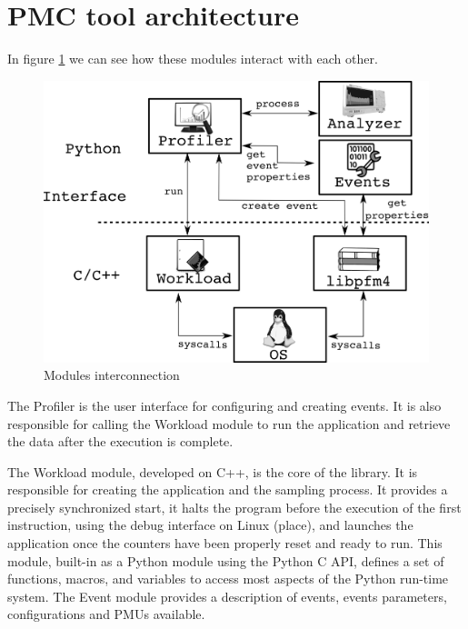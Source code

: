 
\section{PMC tool architecture} \label{sec:PMC_tool_architecture}

In figure \ref{fig:achitecture} we can see how these modules interact with each other.
\begin{figure}[H]
    \centering
    \includegraphics[width=\textwidth]{fingerprint/figures/architecture.png}
    \caption{Modules interconnection}
    \label{fig:achitecture}
\end{figure}

The Profiler is the user interface for configuring and creating events.
It is also responsible for calling the Workload module to run the application and retrieve the data after the execution is complete.

The Workload module, developed on C++, is the core of the library.
It is responsible for creating the application and the sampling process.
It provides a precisely synchronized start, it halts the program before the execution of the first instruction, using the debug interface on Linux (place), and launches the application once the counters have been properly reset and ready to run.
This module, built-in as a Python module using the Python C API, defines a set of functions, macros, and variables to access most aspects of the Python run-time system.
The Event module provides a description of events, events parameters, configurations and PMUs available.

